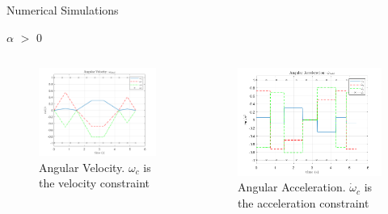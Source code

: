 \documentclass{beamer}
\begin{document}
\begin{frame}{Numerical Simulations}
	\begin{block}{$\alpha$ $>$ 0}

		\begin{columns}
			\begin{column}{0.5\textwidth}
				\begin{figure}
					\centering
					\label{fig:ang_vel_phi_total}
					\includegraphics[width=2.25in]{figures/alphaNot0/ang_vel_phi_total.png}
					\caption{Angular Velocity. $\omega_c$ is the velocity constraint}
				\end{figure}
			\end{column}
			\begin{column}{0.5\textwidth}
				\begin{figure}[H]
					\label{fig:ang_accel_total}
					\begin{center}
						\includegraphics[width=2.25in]{figures/alphaNot0/ang_accel_total.png}
					\end{center}
					\caption{Angular Acceleration. $\dot{\omega}_c$ is the acceleration constraint}
				\end{figure}
			\end{column}
		\end{columns}		

	\end{block}
\end{frame}
\end{document}
